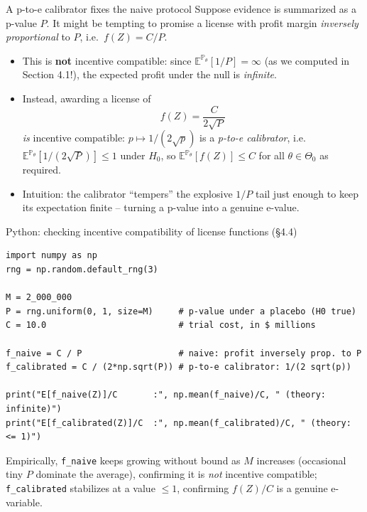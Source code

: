 \documentclass[aspectratio=169,10pt]{beamer}
\begin{document}
\begin{frame}{A p-to-e calibrator fixes the naive protocol}
  Suppose evidence is summarized as a p-value $P$. It might be tempting to
  promise a license with profit margin \emph{inversely proportional} to
  $P$, i.e.\ $f(Z)=C/P$.
  \begin{itemize}
    \item This is \textbf{not} incentive compatible: since
    $\mathbb E^{\mathbb P_\theta}[1/P]=\infty$ (as we computed in Section 4.1!),
    the expected profit under the null is \emph{infinite}.
    \item Instead, awarding a license of
    \[
      f(Z) = \frac{C}{2\sqrt{P}}
    \]
    \emph{is} incentive compatible: $p\mapsto 1/(2\sqrt p)$ is a
    \emph{p-to-e calibrator}, i.e.\ $\mathbb E^{\mathbb P_\theta}[1/(2\sqrt P)]\le1$
    under $H_0$, so $\mathbb E^{\mathbb P_\theta}[f(Z)]\le C$ for all
    $\theta\in\Theta_0$ as required.
    \item Intuition: the calibrator ``tempers'' the explosive $1/P$ tail
    just enough to keep its expectation finite -- turning a p-value into a
    genuine e-value.
  \end{itemize}
\end{frame}

\begin{frame}[fragile]{Python: checking incentive compatibility of license functions (\S4.4)}
\begin{lstlisting}
import numpy as np
rng = np.random.default_rng(3)

M = 2_000_000
P = rng.uniform(0, 1, size=M)     # p-value under a placebo (H0 true)
C = 10.0                          # trial cost, in $ millions

f_naive = C / P                   # naive: profit inversely prop. to P
f_calibrated = C / (2*np.sqrt(P)) # p-to-e calibrator: 1/(2 sqrt(p))

print("E[f_naive(Z)]/C       :", np.mean(f_naive)/C, " (theory: infinite)")
print("E[f_calibrated(Z)]/C  :", np.mean(f_calibrated)/C, " (theory: <= 1)")
\end{lstlisting}
  Empirically, \texttt{f\_naive} keeps growing without bound as $M$
  increases (occasional tiny $P$ dominate the average), confirming it is
  \emph{not} incentive compatible; \texttt{f\_calibrated} stabilizes at a
  value $\le 1$, confirming $f(Z)/C$ is a genuine e-variable.
\end{frame}
\end{document}
